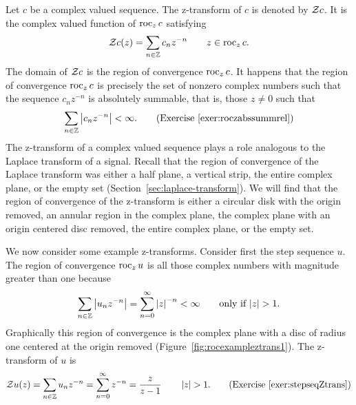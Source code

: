 
Let $c$ be a complex valued sequence.  The z-transform of $c$ is denoted by ${\mathcal Z} c$.  It is the complex valued function of $\operatorname{roc}_z c$ satisfying
\[
{\mathcal Z} c(z) = \sum_{n \in {\mathbb Z}} c_n z^{-n} \qquad z \in \operatorname{roc}_z c.
\]
The domain of ${\mathcal Z} c$ is the region of convergence $\operatorname{roc}_z c$.  It happens that the region of convergence $\operatorname{roc}_z c$ is precisely the set of nonzero complex numbers such that the sequence $c_n z^{-n}$ is absolutely summable, that is, those $z \neq 0$ such that
\[
\sum_{n \in {\mathbb Z}} \left\vert c_n z^{-n} \right\vert < \infty. \qquad \text{(Exercise~\ref{exer:roczabssummrel})}
\]
The z-transform of a complex valued sequence plays a role analogous to the Laplace transform of a signal.  Recall that the region of convergence of the Laplace transform was either a half plane, a vertical strip, the entire complex plane, or the empty set (Section~\ref{sec:laplace-transform}).  We will find that the region of convergence of the z-transform is either a circular disk with the origin removed, an annular region in the complex plane, the complex plane with an origin centered disc removed, the entire complex plane, or the empty set.

We now consider some example z-transforms.  Consider first the step sequence $u$.  The region of convergence $\operatorname{roc}_z u$ is all those complex numbers with magnitude greater than one because
\[
\sum_{n\in{\mathbb Z}} \left\vert u_n z^{-n} \right\vert = \sum_{n=0}^\infty \left\vert z \right\vert^{-n} < \infty \qquad \text{only if $\left\vert z \right\vert > 1$}.
\]
Graphically this region of convergence is the complex plane with a disc of radius one centered at the origin removed (Figure~\ref{fig:rocexampleztrans1}).  The z-transform of $u$ is
\[
{\mathcal Z} u(z) = \sum_{n \in {\mathbb Z}} u_n z^{-n} = \sum_{n=0}^\infty z^{-n} = \frac{z}{z - 1} \qquad \left\vert z \right\vert > 1. \qquad \text{(Exercise~\ref{exer:stepseqZtrans})}
\]


